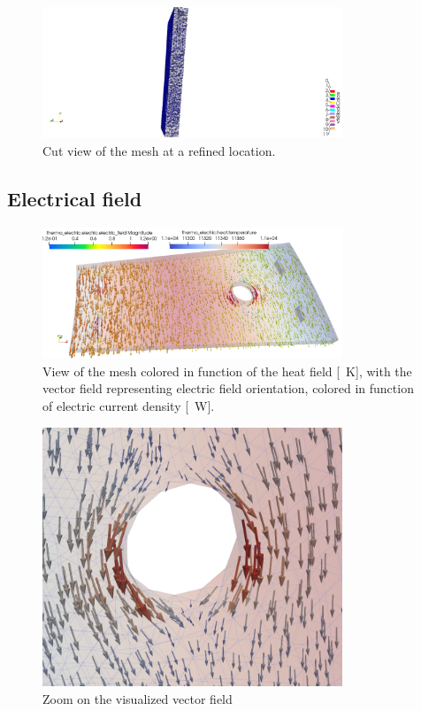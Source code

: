 \documentclass[12pt]{article}
\begin{document}
\begin{figure}[H]
  \centering
  \includegraphics[width=0.8\textwidth]{images/raffiner2.png}
  \caption{Cut view of the mesh at a refined location.}
\end{figure}

\subsection{Electrical field}

\begin{figure}[H]
  \centering
  \includegraphics[width=0.8\textwidth]{images/glyph2.png}
  \caption{View of the mesh colored in function of the heat field [\SI{}{\kelvin}],
    with the vector field representing electric field orientation, colored in function
  of electric current density [\SI{}{\watt}].}
\end{figure}

\begin{figure}
  \centering
  \includegraphics[width=0.8\textwidth]{images/field1_zoom.png}
  \caption{Zoom on the visualized vector field}
\end{figure}
\end{document}
